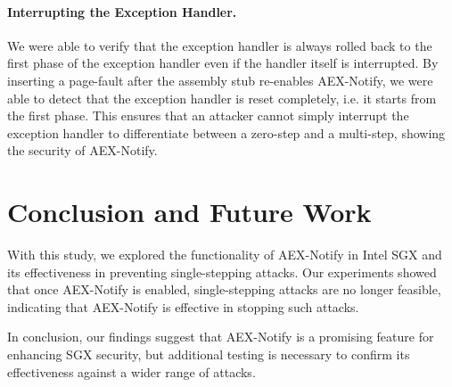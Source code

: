 \documentclass{llncs}
\begin{document}

\paragraph{Interrupting the Exception Handler.}
We were able to verify that the exception handler is always rolled back to the first phase of the exception handler
even if the handler itself is interrupted.
By inserting a page-fault after the assembly stub re-enables AEX-Notify,
we were able to detect that the exception handler is reset completely,
i.e. it starts from the first phase.
This ensures that an attacker cannot simply interrupt the exception handler
to differentiate between a zero-step and a multi-step,
showing the security of AEX-Notify.

\section{Conclusion and Future Work}

With this study, we explored the functionality of AEX-Notify in Intel SGX and
its effectiveness in preventing single-stepping attacks.
Our experiments showed that once AEX-Notify is enabled,
single-stepping attacks are no longer feasible,
indicating that AEX-Notify is effective in stopping such attacks.

In conclusion, our findings suggest that AEX-Notify is a promising feature for enhancing SGX security,
but additional testing is necessary to confirm its effectiveness against a wider range of attacks.


%

\end{document}
